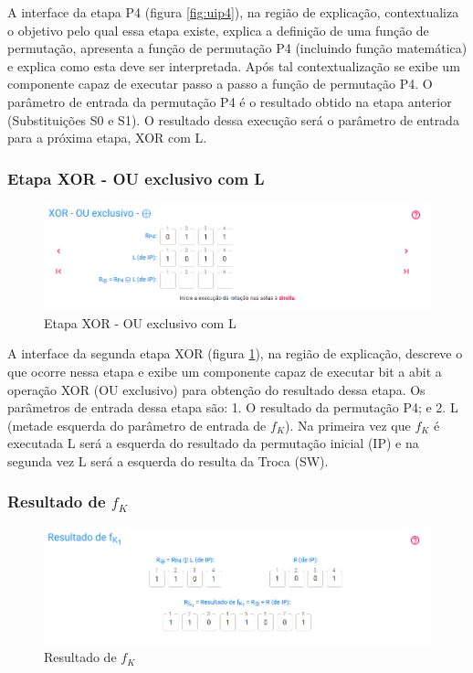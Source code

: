 A interface da etapa P4 (figura \ref{fig:uip4}), na região de explicação, contextualiza o objetivo pelo qual essa etapa existe, explica a definição de uma função de permutação, apresenta a função de permutação P4 (incluindo função matemática) e explica como esta deve ser interpretada. Após tal contextualização se exibe um componente capaz de executar passo a passo a função de permutação P4. O parâmetro de entrada da permutação P4 é o resultado obtido na etapa anterior (Substituições S0 e S1). O resultado dessa execução será o parâmetro de entrada para a próxima etapa, XOR com L.

\subsubsection{Etapa XOR - OU exclusivo com L}

\begin{figure}[H]
    \centering
    \caption{Etapa XOR - OU exclusivo com L}
    \label{fig:uixorl}
    \includegraphics[width=1\linewidth]{UI/UIXORL.png}
\end{figure}

A interface da segunda etapa XOR (figura \ref{fig:uixorl}), na região de explicação, descreve o que ocorre nessa etapa e exibe um componente capaz de executar bit a abit a operação XOR (OU exclusivo) para obtenção do resultado dessa etapa. Os parâmetros de entrada dessa etapa são: 1. O resultado da permutação P4; e 2. L (metade esquerda do parâmetro de entrada de \(f_K\)). Na primeira vez que \(f_K\) é executada L será a esquerda do resultado da permutação inicial (IP) e na segunda vez L será a esquerda do resulta da Troca (SW).

\subsubsection{Resultado de \(f_K\)}

\begin{figure}[H]
    \centering
    \caption{Resultado de \(f_K\)}
    \label{fig:uirfk1}
    \includegraphics[width=1\linewidth]{UI/UIRFK1.png}
\end{figure}

